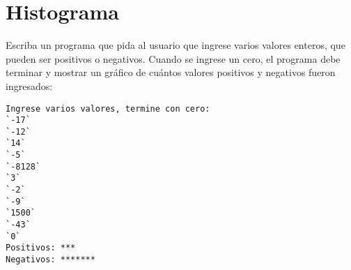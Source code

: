 \section{Histograma}

Escriba un programa que pida al usuario que ingrese varios valores
enteros, que pueden ser positivos o negativos. Cuando se ingrese un
cero, el programa debe terminar y mostrar un gráfico de cuántos valores
positivos y negativos fueron ingresados:

\begin{lstlisting}[language=testcase]
Ingrese varios valores, termine con cero:
`-17`
`-12`
`14`
`-5`
`-8128`
`3`
`-2`
`-9`
`1500`
`-43`
`0`
Positivos: ***
Negativos: *******
\end{lstlisting}
